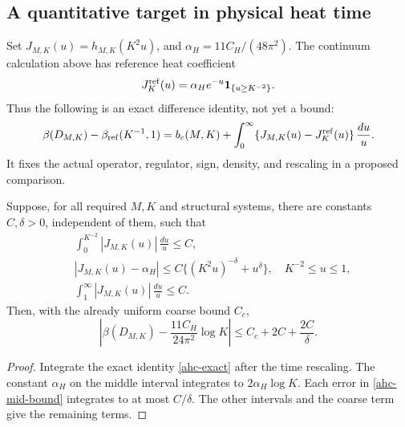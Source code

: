 \subsection{A quantitative target in physical heat time}
\label{ahc-target-section}

Set \(J_{M,K}(u)=h_{M,K}(K^2u)\), and
\(\alpha_H=11C_H/(48\pi^2)\).
The continuum calculation above has reference heat
coefficient
\[
 J_K^{\rm ref}(u)=\alpha_H e^{-u}
                         {\bf1}_{\{u\ge K^{-2}\}}.
\]
Thus the following is an exact difference identity,
not yet a bound:
\begin{equation}
 \beta(D_{M,K})-\beta_{\rm ref}(K^{-1},1)
 =b_c(M,K)+\int_0^\infty
          \{J_{M,K}(u)-J_K^{\rm ref}(u)\}\,\frac{du}{u}.
 \label{ahc-difference}
\end{equation}
It fixes the actual operator, regulator, sign, density,
and rescaling in a proposed comparison.

\begin{lemma}
\label{ahc-band-lemma}
Suppose, for all required \(M,K\) and structural systems,
there are constants \(C,\delta>0\), independent of them,
such that
\begin{align}
 &\int_0^{K^{-2}}|J_{M,K}(u)|\,\frac{du}{u}\le C,
                                      \label{ahc-uv-bound}\\
 &|J_{M,K}(u)-\alpha_H|
       \le C\{(K^2u)^{-\delta}+u^\delta\},
          \quad K^{-2}\le u\le1,       \label{ahc-mid-bound}\\
 &\int_1^\infty|J_{M,K}(u)|\,\frac{du}{u}\le C.
                                      \label{ahc-ir-bound}
\end{align}
Then, with the already uniform coarse bound \(C_c\),
\begin{equation}
 \left|\beta(D_{M,K})
       -\frac{11C_H}{24\pi^2}\log K\right|
           \le C_c+2C+\frac{2C}{\delta}.
 \label{ahc-log-conclusion}
\end{equation}
\end{lemma}

\begin{proof}
Integrate the exact identity \eqref{ahc-exact} after
the time rescaling. The constant \(\alpha_H\) on the
middle interval integrates to \(2\alpha_H\log K\).
Each error in \eqref{ahc-mid-bound} integrates to
at most \(C/\delta\). The other intervals and the
coarse term give the remaining terms.
\end{proof}

